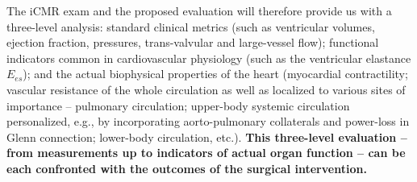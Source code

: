 The iCMR exam and the proposed evaluation will therefore provide us with a three-level analysis: standard clinical metrics (such as ventricular volumes, ejection fraction, pressures, trans-valvular and large-vessel flow); functional indicators common in cardiovascular physiology (such as the ventricular elastance $E_{es}$); and the actual biophysical properties of the heart (myocardial contractility; vascular resistance of the whole circulation as well as localized to various sites of importance -- pulmonary circulation; upper-body systemic circulation personalized, e.g., by incorporating aorto-pulmonary collaterals and power-loss in Glenn connection; lower-body circulation, etc.). 
 \textbf{This three-level evaluation -- from measurements
up to indicators of actual organ function -- can be each confronted with the outcomes of the surgical intervention.}




